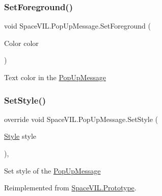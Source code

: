 \mbox{\label{class_space_v_i_l_1_1_pop_up_message_ae46f44949f484301b57b2ee6cb367ee9}} 
\subsubsection{\texorpdfstring{Set\+Foreground()}{SetForeground()}}
{\footnotesize\ttfamily void Space\+V\+I\+L.\+Pop\+Up\+Message.\+Set\+Foreground (\begin{DoxyParamCaption}\item[{Color}]{color }\end{DoxyParamCaption})\hspace{0.3cm}{\ttfamily [inline]}}



Text color in the \mbox{\hyperlink{class_space_v_i_l_1_1_pop_up_message}{Pop\+Up\+Message}} 

\mbox{\label{class_space_v_i_l_1_1_pop_up_message_adeaf6b8c53f63d24c8342182ac699708}} 
\subsubsection{\texorpdfstring{Set\+Style()}{SetStyle()}}
{\footnotesize\ttfamily override void Space\+V\+I\+L.\+Pop\+Up\+Message.\+Set\+Style (\begin{DoxyParamCaption}\item[{\mbox{\hyperlink{class_space_v_i_l_1_1_decorations_1_1_style}{Style}}}]{style }\end{DoxyParamCaption})\hspace{0.3cm}{\ttfamily [inline]}, {\ttfamily [virtual]}}



Set style of the \mbox{\hyperlink{class_space_v_i_l_1_1_pop_up_message}{Pop\+Up\+Message}} 



Reimplemented from \mbox{\hyperlink{class_space_v_i_l_1_1_prototype_ae96644a6ace490afb376fb542161e541}{Space\+V\+I\+L.\+Prototype}}.

